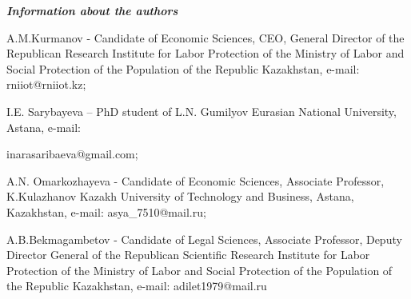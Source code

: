 \emph{{\bfseries Information about the authors}}

\begin{noparindent}
A.M.Kurmanov - Candidate of Economic Sciences, CEO, General Director of
the Republican Research Institute for Labor Protection of the Ministry
of Labor and Social Protection of the Population of the Republic
Kazakhstan, e-mail: rniiot@rniiot.kz;

I.E. Sarybayeva -- PhD student of L.N. Gumilyov Eurasian National
University, Astana, e-mail:

inarasaribaeva@gmail.com;

A.N. Omarkozhayeva - Candidate of Economic Sciences, Associate
Professor, K.Kulazhanov Kazakh University of Technology and Business,
Astana, Kazakhstan, e-mail: asya\_7510@mail.ru;

A.B.Bekmagambetov - Candidate of Legal Sciences, Associate Professor,
Deputy Director General of the Republican Scientific Research Institute
for Labor Protection of the Ministry of Labor and Social Protection of
the Population of the Republic Kazakhstan, e-mail: adilet1979@mail.ru
\end{noparindent}
